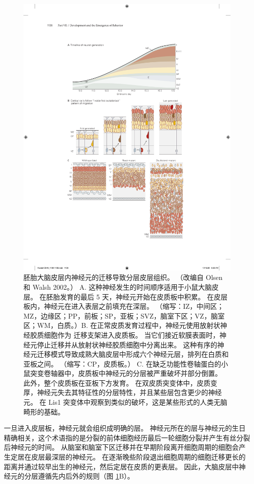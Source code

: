 \begin{figure}[htbp]
	\centering
	\includegraphics[width=0.8\linewidth]{chap46/fig_46_5}
	\caption{胚胎大脑皮层内神经元的迁移导致分层皮层组织。 （改编自 Olsen 和 Walsh 2002。） A. 这种神经发生的时间顺序适用于小鼠大脑皮层。 在胚胎发育的最后 5 天，神经元开始在皮质板中积累。 在皮层板内，神经元在进入表层之前填充在深层。 （缩写：IZ，中间区；MZ，边缘区；PP，前板；SP，亚板；SVZ，脑室下区；VZ，脑室区；WM，白质。）B. 在正常皮质发育过程中，神经元使用放射状神经胶质细胞作为 迁移支架进入皮质板。 当它们接近软膜表面时，神经元停止迁移并从放射状神经胶质细胞中分离出来。 这种有序的神经元迁移模式导致成熟大脑皮层中形成六个神经元层，排列在白质和亚板之间。 （缩写：CP，皮质板。） C. 在缺乏功能性卷轴蛋白的小鼠突变卷轴器中，皮质板中神经元的分层被严重破坏并部分倒置。 此外，整个皮质板在亚板下方发育。 在双皮质突变体中，皮质变厚，神经元失去其特征性的分层特性，并且某些层包含更少的神经元。 在 Lis1 突变体中观察到类似的破坏，这是某些形式的人类无脑畸形的基础。}
	\label{fig:46_5}
\end{figure}

一旦进入皮层板，神经元就会组织成明确的层。 神经元所在的层与神经元的生日精确相关，这个术语指的是分裂的前体细胞经历最后一轮细胞分裂并产生有丝分裂后神经元的时间。 从脑室和脑室下区迁移并在早期阶段离开细胞周期的细胞会产生定居在皮层最深层的神经元。 在逐渐晚些阶段退出细胞周期的细胞迁移更长的距离并通过较早出生的神经元，然后定居在皮质的更表层。 因此，大脑皮层中神经元的分层遵循先内后外的规则（图 \ref{fig:46_5}B）。


